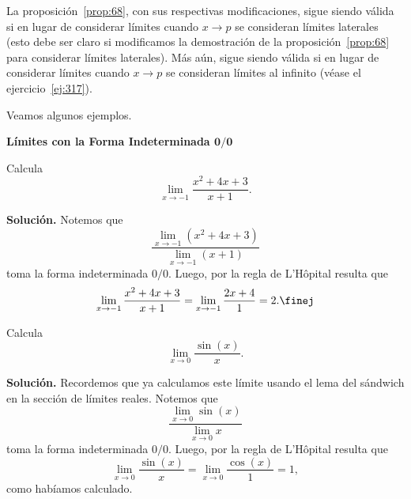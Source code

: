 \documentclass[12pt,a4paper]{book}
\newcommand{\subtitulo}[1]{\par\avoidorphan{5}\addvspace{\medskipamount}\noindent\textbf{#1}\par\nobreak}
\begin{document}
    La proposición~\ref{prop:68}, con sus respectivas modificaciones, sigue siendo válida
    si en lugar de considerar límites cuando $x\to p$ se consideran límites laterales
    (esto debe ser claro si modificamos la demostración de la proposición~\ref{prop:68}
    para considerar límites laterales). Más aún, sigue siendo válida si en lugar
    de considerar límites cuando $x\to p$ se consideran límites al infinito (véase el
    ejercicio~\ref{ej:317}).

    Veamos algunos ejemplos.

    \subtitulo{Límites con la Forma Indeterminada $\boldsymbol{0/0}$}

    \begin{ejemplo}\label{ejm:99}
        Calcula
        \begin{equation*}
            \lim_{x\to -1}\frac{x^{2}+4x+3}{x+1}.
        \end{equation*}

        \textbf{Solución.} Notemos que
        \begin{equation*}
            \frac{\lim_{x\to -1}\left(x^{2}+4x+3\right)}{\lim_{x\to -1}(x+1)}
        \end{equation*}
        toma la forma indeterminada $0/0$. Luego, por la regla de L'Hôpital resulta
        que
        \begin{equation*}
            \lim_{x\to -1}\frac{x^{2}+4x+3}{x+1}=\lim_{x\to -1}\frac{2x+4}{1}=2.\finej
        \end{equation*}
    \end{ejemplo}

    \begin{ejemplo}\label{ejm:100}
        Calcula
        \begin{equation*}
            \lim_{x\to 0}\frac{\sin(x)}{x}.
        \end{equation*}

        \textbf{Solución.} Recordemos que ya calculamos este límite usando el lema del
        sándwich en la sección de límites reales. Notemos que
        \begin{equation*}
            \frac{\lim_{x\to 0}\sin(x)}{\lim_{x\to 0}x}
        \end{equation*}
        toma la forma indeterminada $0/0$. Luego, por la regla de L'Hôpital resulta
        que
        \begin{equation*}
            \lim_{x\to 0}\frac{\sin(x)}{x}=\lim_{x\to 0}\frac{\cos(x)}{1}=1,
        \end{equation*}
        como habíamos calculado.
    \end{ejemplo}
\end{document}

